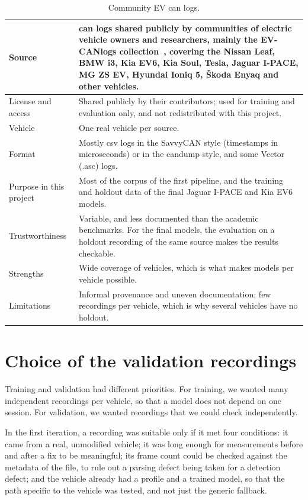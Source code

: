 \begin{table}[H]
\centering
\footnotesize
\caption{Community EV \gls{can} logs.}
\label{tab:app-community}
\begin{tabularx}{\textwidth}{|P{3cm}|Y|}
\hline
Source & \gls{can} logs shared publicly by communities of electric vehicle owners and researchers, mainly the EV-CANlogs collection~\cite{evcanlogs}, covering the Nissan Leaf, BMW i3, Kia EV6, Kia Soul, Tesla, Jaguar I-PACE, MG ZS EV, Hyundai Ioniq 5, Škoda Enyaq and other vehicles. \\
\hline
License and access & Shared publicly by their contributors; used for training and evaluation only, and not redistributed with this project. \\
\hline
Vehicle & One real vehicle per source. \\
\hline
Format & Mostly \gls{csv} logs in the SavvyCAN style (timestamps in microseconds) or in the candump style, and some Vector (.asc) logs. \\
\hline
Purpose in this project & Most of the corpus of the first pipeline, and the training and holdout data of the final Jaguar I-PACE and Kia EV6 models. \\
\hline
Trustworthiness & Variable, and less documented than the academic benchmarks. For the final models, the evaluation on a holdout recording of the same source makes the results checkable. \\
\hline
Strengths & Wide coverage of vehicles, which is what makes models per vehicle possible. \\
\hline
Limitations & Informal provenance and uneven documentation; few recordings per vehicle, which is why several vehicles have no holdout. \\
\hline
\end{tabularx}
\end{table}

\section{Choice of the validation recordings}

Training and validation had different priorities. For training, we wanted many independent recordings per vehicle, so that a model does not depend on one session. For validation, we wanted recordings that we could check independently.

In the first iteration, a recording was suitable only if it met four conditions: it came from a real, unmodified vehicle; it was long enough for measurements before and after a fix to be meaningful; its frame count could be checked against the metadata of the file, to rule out a parsing defect being taken for a detection defect; and the vehicle already had a profile and a trained model, so that the path specific to the vehicle was tested, and not just the generic fallback.

